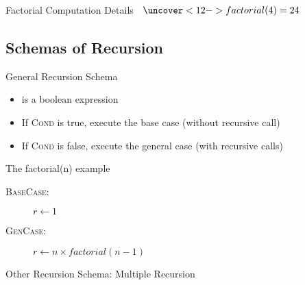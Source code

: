 \begin{Coupe}
\begin{frame}{Factorial Computation Details}
  $  \left.\begin{array}{l}
       \uncover<12->{factorial(4) = 24}
     \end{array}\right.
  $


\end{frame}
\subsection{Schemas of Recursion}
\subsectionpage
\begin{frame}{General Recursion Schema}

  \centerline{}
  \medskip

  \begin{itemize}
  \item {} is a boolean expression
  \item If \textsc{Cond} is true, execute the \alert{base case}
    (\alert{without recursive call})
  \item If \textsc{Cond} is false, execute the \alert{general case}
    (\alert{with recursive calls})
  \end{itemize}

  \begin{block}{The factorial(n) example}
    \begin{description}
    \item[\textsc{BaseCase}:] $r\leftarrow 1$
    \item[\textsc{GenCase}:] $r\leftarrow n\times factorial(n-1)$
    \end{description}
  \end{block}
\end{frame}
\begin{frame}[fragile]{Other Recursion Schema: \alert{Multiple Recursion}}


\end{frame}
\end{Coupe}
